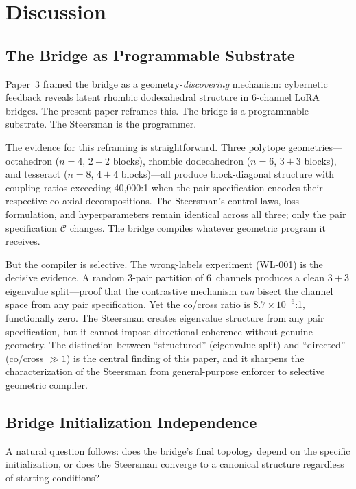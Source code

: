 \section{Discussion}
\label{sec:discussion}

\subsection{The Bridge as Programmable Substrate}
\label{sec:disc-substrate}

Paper~3 framed the bridge as a geometry-\emph{discovering} mechanism:
cybernetic feedback reveals latent rhombic dodecahedral structure in
$6$-channel LoRA bridges. The present paper reframes this. The bridge
is a programmable substrate. The Steersman is the programmer.

The evidence for this reframing is straightforward. Three polytope
geometries---octahedron ($n{=}4$, $2{+}2$ blocks), rhombic dodecahedron
($n{=}6$, $3{+}3$ blocks), and tesseract ($n{=}8$, $4{+}4$
blocks)---all produce block-diagonal structure with coupling ratios
exceeding 40{,}000:1 when the pair specification encodes their
respective co-axial decompositions. The Steersman's control laws,
loss formulation, and hyperparameters remain identical across all three;
only the pair specification $\mathcal{C}$ changes. The bridge compiles
whatever geometric program it receives.

But the compiler is selective. The wrong-labels experiment (WL-001) is
the decisive evidence. A random 3-pair partition of 6~channels produces
a clean $3{+}3$ eigenvalue split---proof that the contrastive mechanism
\emph{can} bisect the channel space from any pair specification. Yet the
co/cross ratio is $8.7 \times 10^{-6}$:1, functionally zero. The
Steersman creates eigenvalue structure from any pair specification, but
it cannot impose directional coherence without genuine geometry. The
distinction between ``structured'' (eigenvalue split) and ``directed''
(co/cross $\gg 1$) is the central finding of this paper, and it
sharpens the characterization of the Steersman from general-purpose
enforcer to selective geometric compiler.

\subsection{Bridge Initialization Independence}
\label{sec:disc-init-independence}

A natural question follows: does the bridge's final topology depend on the
specific initialization, or does the Steersman converge to a canonical
structure regardless of starting conditions?

